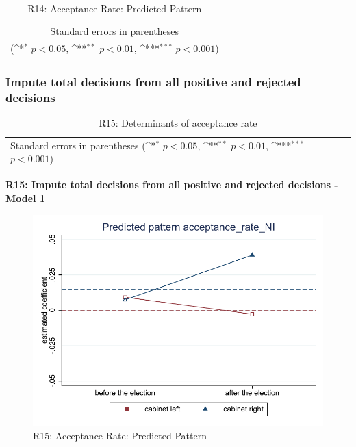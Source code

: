 \documentclass[10pt,a4paper]{scrartcl}
\begin{document}
\begin{table}[!ht]\centering
	\footnotesize
	\renewcommand{\arraystretch}{1.2}
	\def\sym#1{\ifmmode^{#1}\else\(^{#1}\)\fi}
	\caption{R14: Acceptance Rate: Predicted Pattern}
	\begin{tabular}{l*{2}{c}}
		\hline\hline
		
		\hline\hline
		\multicolumn{3}{c}{\footnotesize Standard errors in parentheses} \\
		\multicolumn{3}{c}{\footnotesize (\sym{*} \(p<0.05\), \sym{**} \(p<0.01\), \sym{***} \(p<0.001\))} \\
	\end{tabular}
\end{table}





\clearpage
\FloatBarrier
\subsubsection{Impute total decisions from all positive and rejected decisions}
\begin{table}[!ht]\centering
	\renewcommand{\arraystretch}{1.25}
	\small
	\def\sym#1{\ifmmode^{#1}\else\(^{#1}\)\fi}
	\caption{R15: Determinants of acceptance rate}
	\begin{tabular}{l*{3}{c}}
		\hline\hline
		
		\hline\hline
		\multicolumn{4}{l}{\footnotesize Standard errors in parentheses (\sym{*} \(p<0.05\), \sym{**} \(p<0.01\), \sym{***} \(p<0.001\))}\\
	\end{tabular}
\end{table}

\clearpage
\textbf{R15: Impute total decisions from all positive and rejected decisions - Model 1}
\begin{figure}[!ht]
	\centering
	\includegraphics[width=1\textwidth]{figures_edited/acceptance_rate_NI_graph1_R15.pdf}
	\caption{R15: Acceptance Rate: Predicted Pattern}
\end{figure}
\end{document}
